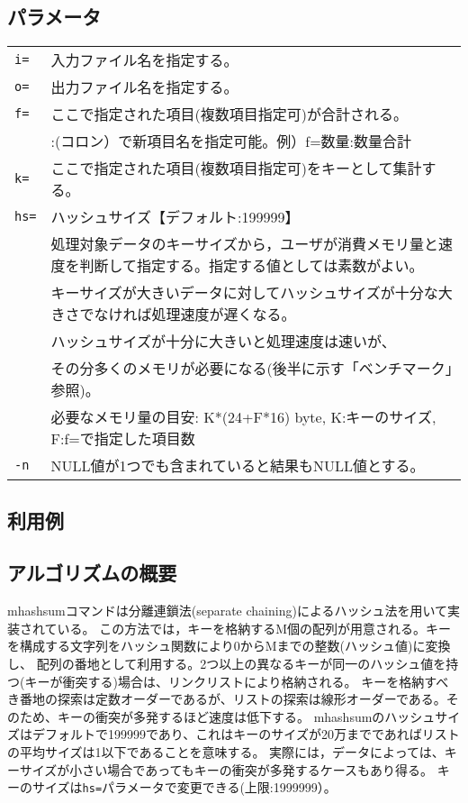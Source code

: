 \subsection*{パラメータ}
\begin{table}[htbp]
{\small
\begin{tabular}{ll}
\verb|i=|    & 入力ファイル名を指定する。\\
\verb|o=|    & 出力ファイル名を指定する。\\
\verb|f=|    & ここで指定された項目(複数項目指定可)が合計される。\\
             & :(コロン）で新項目名を指定可能。例）f=数量:数量合計\\
\verb|k=|    & ここで指定された項目(複数項目指定可)をキーとして集計する。\\
\verb|hs=|   & ハッシュサイズ【デフォルト:199999】 \\
             & 処理対象データのキーサイズから，ユーザが消費メモリ量と速度を判断して指定する。指定する値としては素数がよい。 \\
             & キーサイズが大きいデータに対してハッシュサイズが十分な大きさでなければ処理速度が遅くなる。 \\
             & ハッシュサイズが十分に大きいと処理速度は速いが、\\
             & その分多くのメモリが必要になる(後半に示す「ベンチマーク」参照)。\\
             & 必要なメモリ量の目安: K*(24+F*16) byte, K:キーのサイズ, F:f=で指定した項目数  \\
\verb|-n|    & NULL値が1つでも含まれていると結果もNULL値とする。\\
\end{tabular} 
}
\end{table} 

\subsection*{利用例}


\subsection*{アルゴリズムの概要}
mhashsumコマンドは分離連鎖法(separate chaining)によるハッシュ法を用いて実装されている。
この方法では，キーを格納するM個の配列が用意される。キーを構成する文字列をハッシュ関数により0からMまでの整数(ハッシュ値)に変換し、
配列の番地として利用する。2つ以上の異なるキーが同一のハッシュ値を持つ(キーが衝突する)場合は、リンクリストにより格納される。
キーを格納すべき番地の探索は定数オーダーであるが、リストの探索は線形オーダーである。そのため、キーの衝突が多発するほど速度は低下する。
mhashsumのハッシュサイズはデフォルトで199999であり、これはキーのサイズが20万までであればリストの平均サイズは1以下であることを意味する。
実際には，データによっては、キーサイズが小さい場合であってもキーの衝突が多発するケースもあり得る。
キーのサイズは\verb|hs=|パラメータで変更できる(上限:1999999）。

